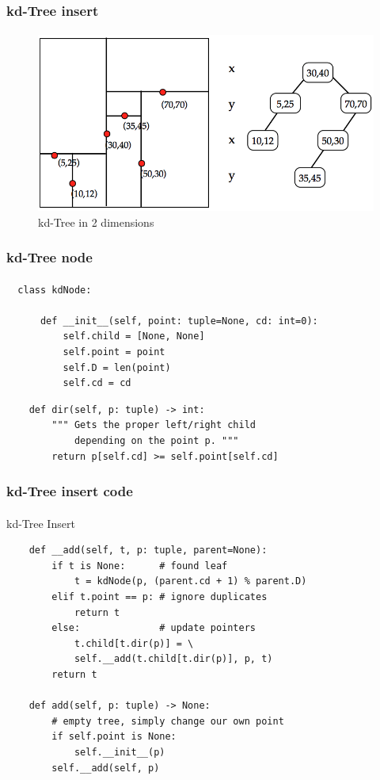 \documentclass{beamer}                             %
\begin{document}
\begin{frame}
\frametitle{kd-Tree insert}
\framesubtitle{}

\begin{figure}[h!]
  \centering
  \includegraphics[scale=0.35]{kd-tree}
  \caption{kd-Tree in 2 dimensions}
\end{figure}
\end{frame}

\begin{frame}[fragile]
\frametitle{kd-Tree node}
\framesubtitle{}
\begin{verbatim}
  class kdNode:

      def __init__(self, point: tuple=None, cd: int=0):
          self.child = [None, None]
          self.point = point
          self.D = len(point)
          self.cd = cd
\end{verbatim}

\begin{verbatim}
    def dir(self, p: tuple) -> int:
        """ Gets the proper left/right child
            depending on the point p. """
        return p[self.cd] >= self.point[self.cd]
\end{verbatim}
\end{frame}

\begin{frame}[fragile]
\frametitle{kd-Tree insert code}
\framesubtitle{}
\begin{algorithm}[H]
  \caption{kd-Tree Insert}
  \begin{verbatim}
    def __add(self, t, p: tuple, parent=None):
        if t is None:      # found leaf
            t = kdNode(p, (parent.cd + 1) % parent.D)
        elif t.point == p: # ignore duplicates
            return t
        else:              # update pointers
            t.child[t.dir(p)] = \
            self.__add(t.child[t.dir(p)], p, t)
        return t

    def add(self, p: tuple) -> None:
        # empty tree, simply change our own point
        if self.point is None:
            self.__init__(p)
        self.__add(self, p)
  \end{verbatim}
\end{algorithm}
\end{frame}
\end{document}
